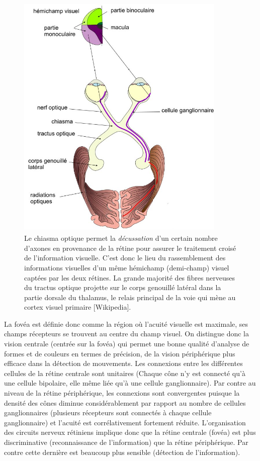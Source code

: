 \begin{figure} [htbp]
\begin{center}
\includegraphics[width=10cm,height=12cm]{figures/ch2_3_Voies}
\end{center}
\caption{Le chiasma optique permet la \textit{décussation} d'un certain nombre d'axones en provenance de la rétine pour assurer le traitement croisé de l'information visuelle. C'est donc le lieu du rassemblement des informations visuelles d'un même hémichamp (demi-champ) visuel captées par les deux rétines. La grande majorité des fibres nerveuses du tractus optique projette sur le corps genouillé latéral dans la partie dorsale du thalamus, le relais principal de la voie qui mène au cortex visuel primaire [Wikipedia]. }
\label{Dec}
\end{figure}

La fovéa est définie donc comme la région o\`u l'acuité visuelle est maximale, ses champs récepteurs se trouvent au centre du champ visuel. On distingue donc la vision centrale (centrée sur la fovéa) qui permet une bonne qualité d'analyse de formes et de couleurs en termes de précision, de la vision périphérique plus efficace dans la détection de mouvements. Les connexions entre les différentes cellules de la rétine centrale sont unitaires (Chaque cône n'y est connecté qu'à une cellule bipolaire, elle même liée qu'à une cellule ganglionnaire). Par contre au niveau de la rétine périphérique, les connexions sont convergentes puisque la densité des cônes diminue considérablement par rapport au nombre de cellules ganglionnaires (plusieurs récepteurs sont connectés à chaque cellule ganglionnaire) et l'acuité est corrélativement fortement réduite. L'organisation des circuits nerveux rétiniens implique donc que la rétine centrale (fovéa) est plus discriminative (reconnaissance de l'information) que la rétine périphérique. Par contre cette dernière est beaucoup plus sensible (détection de l'information).\\



